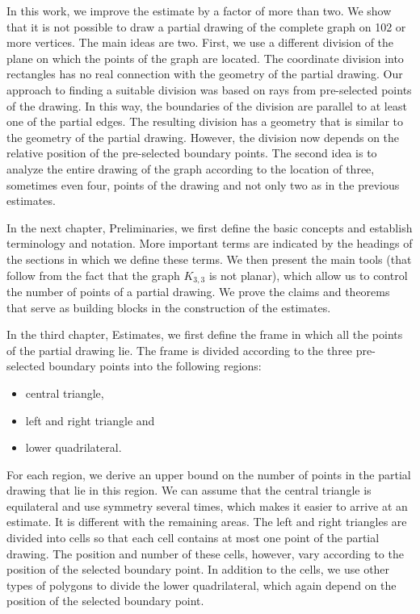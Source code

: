 In this work, we improve the estimate by a factor of more than two. We show that it is not possible to draw a partial drawing of the complete graph on 102 or more vertices. The main ideas are two. First, we use a different division of the plane on which the points of the graph are located. The coordinate division into rectangles has no real connection with the geometry of the partial drawing. Our approach to finding a suitable division was based on rays from pre-selected points of the drawing. In this way, the boundaries of the division are parallel to at least one of the partial edges. The resulting division has a geometry that is similar to the geometry of the partial drawing. However, the division now depends on the relative position of the pre-selected boundary points. The second idea is to analyze the entire drawing of the graph according to the location of three, sometimes even four, points of the drawing and not only two as in the previous estimates.

In the next chapter, Preliminaries, we first define the basic concepts and establish terminology and notation. More important terms are indicated by the headings of the sections in which we define these terms. We then present the main tools (that follow from the fact that the graph $K_{3,3}$ is not planar), which allow us to control the number of points of a partial drawing. We prove the claims and theorems that serve as building blocks in the construction of the estimates.

In the third chapter, Estimates, we first define the frame in which all the points of the partial drawing lie. The frame is divided according to the three pre-selected boundary points into the following regions:
\begin{itemize}
  \item central triangle,
  \item left and right triangle and
  \item lower quadrilateral.
\end{itemize}
For each region, we derive an upper bound on the number of points in the partial drawing that lie in this region. We can assume that the central triangle is equilateral and use symmetry several times, which makes it easier to arrive at an estimate. It is different with the remaining areas. The left and right triangles are divided into cells so that each cell contains at most one point of the partial drawing. The position and number of these cells, however, vary according to the position of the selected boundary point. In addition to the cells, we use other types of polygons to divide the lower quadrilateral, which again depend on the position of the selected boundary point.

